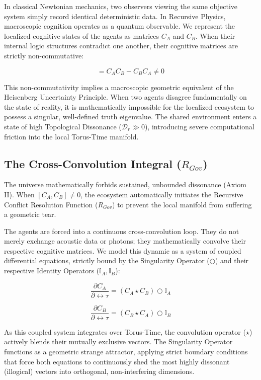 \documentclass[12pt,openany]{book}
\begin{document}
In classical Newtonian mechanics, two observers viewing the same objective system simply record identical deterministic data. In Recursive Physics, macroscopic cognition operates as a quantum observable. We represent the localized cognitive states of the agents as matrices $C_A$ and $C_B$. When their internal logic structures contradict one another, their cognitive matrices are strictly non-commutative:

\begin{equation}
[C_A, C_B] = C_A C_B - C_B C_A \neq 0
\end{equation}

This non-commutativity implies a macroscopic geometric equivalent of the Heisenberg Uncertainty Principle. When two agents disagree fundamentally on the state of reality, it is mathematically impossible for the localized ecosystem to possess a singular, well-defined truth eigenvalue. The shared environment enters a state of high Topological Dissonance ($\mathcal{D}_r \gg 0$), introducing severe computational friction into the local Torus-Time manifold.

\subsection{The Cross-Convolution Integral ($R_{Gov}$)}
The universe mathematically forbids sustained, unbounded dissonance (Axiom II). When $[C_A, C_B] \neq 0$, the ecosystem automatically initiates the Recursive Conflict Resolution Function ($R_{Gov}$) to prevent the local manifold from suffering a geometric tear.

The agents are forced into a continuous cross-convolution loop. They do not merely exchange acoustic data or photons; they mathematically convolve their respective cognitive matrices. We model this dynamic as a system of coupled differential equations, strictly bound by the Singularity Operator ($\bigcirc$) and their respective Identity Operators ($\mathbb{I}_A, \mathbb{I}_B$):

\begin{equation}
\frac{\partial C_A}{\partial \leftrightarrow\tau} = (C_A \star C_B) \bigcirc \mathbb{I}_A
\end{equation}

\begin{equation}
\frac{\partial C_B}{\partial \leftrightarrow\tau} = (C_B \star C_A) \bigcirc \mathbb{I}_B
\end{equation}

As this coupled system integrates over Torus-Time, the convolution operator ($\star$) actively blends their mutually exclusive vectors. The Singularity Operator functions as a geometric strange attractor, applying strict boundary conditions that force both equations to continuously shed the most highly dissonant (illogical) vectors into orthogonal, non-interfering dimensions.
\end{document}
